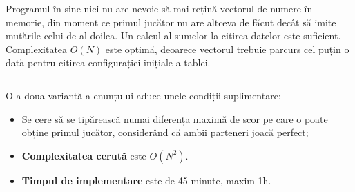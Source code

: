 
Programul în sine nici nu are nevoie să mai rețină vectorul de numere în
memorie, din moment ce primul jucător nu are altceva de făcut decât să imite
mutările celui de-al doilea. Un calcul al sumelor la citirea datelor este
suficient. Complexitatea $O(N)$ este optimă, deoarece vectorul trebuie parcurs
cel puțin o dată pentru citirea configurației inițiale a tablei.

\inputminted{c}{src/problem4-1.c}

O a doua variantă a enunțului aduce unele condiții suplimentare:

\begin{itemize}

\item Se cere să se tipărească numai diferența maximă de scor pe care o poate
  obține primul jucător, considerând că ambii parteneri joacă perfect;

\item {\bf Complexitatea cerută} este $O(N^2)$.

\item {\bf Timpul de implementare} este de 45 minute, maxim 1h.

\end{itemize}

